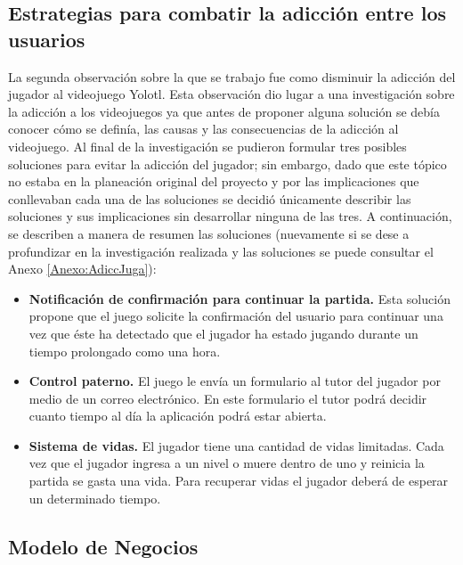 \subsection{Estrategias para combatir la adicción entre los usuarios}
La segunda observación sobre la que se trabajo fue como disminuir la adicción 
del jugador al videojuego Yolotl. Esta observación dio lugar a una investigación 
sobre la adicción a los videojuegos ya que antes de proponer alguna solución se 
debía conocer cómo se definía, las causas y las consecuencias de la adicción al 
videojuego. Al final de la investigación se pudieron formular tres posibles 
soluciones para evitar la adicción del jugador; sin embargo, dado que este tópico 
no estaba en la planeación original del proyecto y por las implicaciones que 
conllevaban cada una de las soluciones se decidió únicamente describir las 
soluciones y sus implicaciones sin desarrollar ninguna de las tres. A continuación, 
se describen a manera de resumen las soluciones (nuevamente si se dese a 
profundizar en la investigación realizada y las soluciones se puede consultar 
el Anexo \ref{Anexo:AdiccJuga}):
	\begin{itemize}
		\item \textbf{Notificación de confirmación para continuar la partida.} Esta 
		solución propone que el juego solicite la confirmación del usuario para 
		continuar una vez que éste ha detectado que el jugador ha estado jugando 
		durante un tiempo prolongado como una hora.
		\item \textbf{Control paterno.} El juego le envía un formulario al tutor del 
		jugador por medio de un correo electrónico. En este formulario el tutor podrá 
		decidir cuanto tiempo al día la aplicación podrá estar abierta. 
		\item \textbf{Sistema de vidas.} El jugador tiene una cantidad de vidas 
		limitadas. Cada vez que el jugador ingresa a un nivel o muere dentro de 
		uno y reinicia la partida se gasta una vida. Para recuperar vidas el 
		jugador deberá de esperar un determinado tiempo.
	\end{itemize}
	
\subsection{Modelo de Negocios}